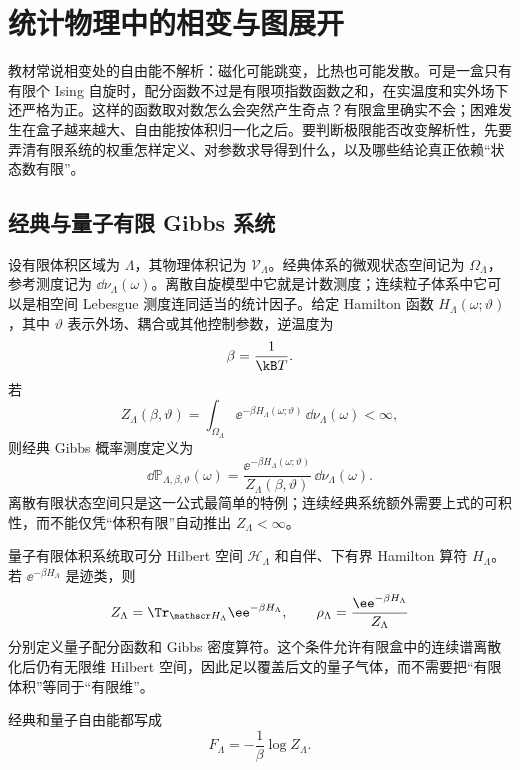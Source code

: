 \chapter{统计物理中的相变与图展开}
\label{chap:phys-sm-general-frameworks}

教材常说相变处的自由能不解析：磁化可能跳变，比热也可能发散。可是一盒只有有限个 Ising 自旋时，配分函数不过是有限项指数函数之和，在实温度和实外场下还严格为正。这样的函数取对数怎么会突然产生奇点？有限盒里确实不会；困难发生在盒子越来越大、自由能按体积归一化之后。要判断极限能否改变解析性，先要弄清有限系统的权重怎样定义、对参数求导得到什么，以及哪些结论真正依赖“状态数有限”。
\section{经典与量子有限 Gibbs 系统}

\begin{definition}
设有限体积区域为 \(\Lambda\)，其物理体积记为 \(\mathcal V_\Lambda\)。经典体系的微观状态空间记为 \(\Omega_\Lambda\)，参考测度记为 \(\dd\nu_\Lambda(\omega)\)。离散自旋模型中它就是计数测度；连续粒子体系中它可以是相空间 Lebesgue 测度连同适当的统计因子。给定 Hamilton 函数 \(H_\Lambda(\omega;\vartheta)\)，其中 \(\vartheta\) 表示外场、耦合或其他控制参数，逆温度为
\begin{equation}
 \beta=\frac{1}{\kB T}.
 \label{eq:phys-sm-beta-definition}
\end{equation}
若
\[
 Z_\Lambda(\beta,\vartheta)
 =\int_{\Omega_\Lambda}
 \ee^{-\beta H_\Lambda(\omega;\vartheta)}\,
 \dd\nu_\Lambda(\omega)<\infty,
\]
则经典 Gibbs 概率测度定义为
\begin{equation}
 \dd\mathbb P_{\Lambda,\beta,\vartheta}(\omega)
 =\frac{\ee^{-\beta H_\Lambda(\omega;\vartheta)}}
 {Z_\Lambda(\beta,\vartheta)}\,
 \dd\nu_\Lambda(\omega).
 \label{eq:phys-sm-finite-gibbs}
\end{equation}
离散有限状态空间只是这一公式最简单的特例；连续经典系统额外需要上式的可积性，而不能仅凭“体积有限”自动推出 \(Z_\Lambda<\infty\)。

量子有限体积系统取可分 Hilbert 空间 \(\mathscr H_\Lambda\) 和自伴、下有界 Hamilton 算符 \(H_\Lambda\)。若 \(\ee^{-\beta H_\Lambda}\) 是迹类，则
\begin{equation}
 Z_\Lambda=\Tr_{\mathscr H_\Lambda}\ee^{-\beta H_\Lambda},
 \qquad
 \rho_\Lambda=\frac{\ee^{-\beta H_\Lambda}}{Z_\Lambda}
 \label{eq:phys-sm-quantum-gibbs}
\end{equation}
分别定义量子配分函数和 Gibbs 密度算符。这个条件允许有限盒中的连续谱离散化后仍有无限维 Hilbert 空间，因此足以覆盖后文的量子气体，而不需要把“有限体积”等同于“有限维”。

经典和量子自由能都写成
\begin{equation}
 F_\Lambda=-\frac{1}{\beta}\log Z_\Lambda.
 \label{eq:phys-sm-finite-free-energy}
\end{equation}
\end{definition}


